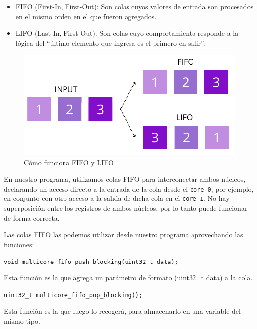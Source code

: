                     \begin{itemize} [label=•]
                        \setlength{\itemindent}{1.5em}
                        \item FIFO (First-In, First-Out): Son colas cuyos valores de entrada son procesados en el mismo orden en el que fueron agregados.
                        \item LIFO (Last-In, First-Out). Son colas cuyo comportamiento responde a la lógica del “último elemento que ingresa es el primero en salir”.
                    \end{itemize}

                    \begin{figure}[H]
                        \centering
                        \includegraphics[width=0.5\linewidth]{Software/FIFO.png}
                        \caption{Cómo funciona FIFO y LIFO}
                        \label{fig:s1}
                    \end{figure}

                    En  nuestro programa, utilizamos colas FIFO para interconectar ambos núcleos, declarando un acceso directo a la entrada de la cola desde el \texttt{core\_0}, por ejemplo, en conjunto con otro acceso a la salida de dicha cola en el \texttt{core\_1}. No hay superposición entre los registros de ambos núcleos, por lo tanto puede funcionar de forma correcta.\par
	                Las colas FIFO las podemos utilizar desde nuestro programa aprovechando las funciones:\par
                    \texttt{void multicore\_fifo\_push\_blocking(uint32\_t data);}\par
                    Esta función es la que agrega un parámetro de formato (uint32\_t data) a la cola.\par
                    \texttt{uint32\_t multicore\_fifo\_pop\_blocking();}\par
                    Esta función es la que luego lo recogerá, para almacenarlo en una variable del mismo tipo.\par


